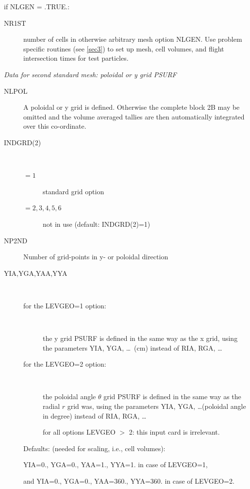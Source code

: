 if NLGEN = .TRUE.:
\begin{description}
  \item[NR1ST] 

        number of cells in otherwise arbitrary mesh option NLGEN.
        Use problem specific routines (see \cref{sec3}) to set up mesh, cell volumes,
        and flight intersection times for test particles.
\end{description}

\textsl{Data for second standard mesh: poloidal or y grid PSURF}
\begin{description}
  \item[NLPOL] A poloidal or y grid is defined.
        Otherwise the complete block 2B may be omitted and the volume averaged tallies
        are then automatically integrated over this co-ordinate.
  \item[INDGRD(2)] ~ 

        \begin{description}
          \item[$= 1$] standard grid option
          \item[$= 2, 3, 4, 5, 6$]
                not in use  (default: INDGRD(2)=1)
        \end{description}
  \item[NP2ND] Number of
        grid-points in y- or poloidal direction
  \item[YIA,YGA,YAA,YYA] ~

        \begin{description}
          \item[for the LEVGEO=1 option:] ~ 

                the y grid PSURF is defined in the same way as the x grid, using the parameters
                YIA, YGA, \dots\ (\si{\centi\metre}) instead of RIA, RGA, \dots

          \item[for the LEVGEO=2 option:] ~ 

                the poloidal angle $\theta$ grid PSURF is defined in the same way as the radial
                $r$ grid was, using the parameters YIA, YGA, \dots(poloidal angle in degree)
                instead of RIA, RGA, \dots 

                for all options LEVGEO $>$ 2:
                this input card is irrelevant.
        \end{description}
        Defaults: (needed for scaling, i.e., cell volumes):

        YIA=0., YGA=0., YAA=1., YYA=1.
        in case of LEVGEO=1,

        and YIA=0., YGA=0., YAA=360., YYA=360. in case of LEVGEO=2.

\end{description}

